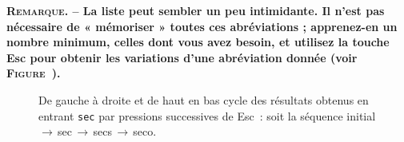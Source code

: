 \documentclass[11pt,french]{article}
\newcommand{\esckey}{\textsf{Esc}}
\newcommand{\To}{\,\(\to\)\,}
\newcommand{\CCT}{\textsf{CommandCompletion.txt}}
\begin{document}

\noindent\textbf{\textsc{Remarque}. -- La liste peut sembler un peu intimidante. Il n'est pas nécessaire de « mémoriser » toutes ces abréviations ; apprenez-en un nombre minimum, celles dont vous avez besoin, et utilisez la touche \esckey{} pour obtenir les variations d'une abréviation donnée (voir \textsc{Figure}~).}
\begin{figure}\centering
{}
\caption{De gauche à droite et de haut en bas cycle des résultats obtenus en entrant \texttt{sec} par pressions successives de \esckey\ : soit la séquence \textsf{initial}\To\textsf{sec}\To\textsf{secs}\To\textsf{seco}.}
\label{fig:sec}
\end{figure}
\end{document}
